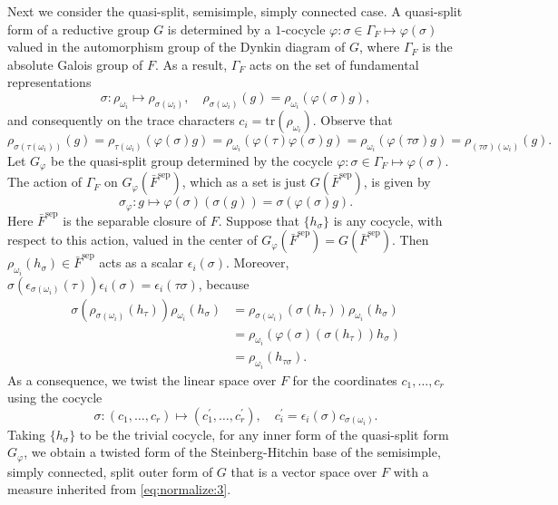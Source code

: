 \documentclass[iccmp]{ipbook}
\newcommand{\tr}{{\mathrm{tr}}}
\def\eps{{\epsilon}}
\def\sig{{\sigma}}
\def\ome{{\omega}}
\def\Gam{{\Gamma}}
\def\vphi{\varphi}
\def\p{\prime}
\def\sep{\mathrm{sep}}
\begin{document}
Next we consider the quasi-split, semisimple, simply connected case.
A quasi-split form of a reductive group $G$ is determined by a $1$-cocycle $\vphi:\sig\in \Gam_F\mapsto \vphi(\sig)$ valued in the automorphism group of the Dynkin diagram of $G$, where $\Gam_F$ is the absolute Galois group of $F$. As a result, $\Gam_F$ acts on the set of fundamental representations
$$
\sig:\rho_{\ome_i}
\mapsto \rho_{\sig(\ome_i)},\quad \rho_{\sig(\ome_i)}(g) = 
\rho_{\ome_i}(\vphi(\sig)g),
$$
and consequently on the trace characters $c_i = \tr(\rho_{\ome_i})$. Observe that
$$
\rho_{\sig(\tau(\ome_i))}(g) = 
\rho_{\tau(\ome_i)}(\vphi(\sig)g) = 
\rho_{\ome_i}(\vphi(\tau)\vphi(\sig)g) = 
\rho_{\ome_i}(\vphi(\tau\sig)g) = 
\rho_{(\tau\sig)(\ome_i)}(g).
$$
Let $G_\vphi$ be the quasi-split group determined by the cocycle $\vphi:\sig\in \Gam_F\mapsto \vphi(\sig)$. The action of $\Gam_F$ on $G_\vphi(\bar{F}^\sep)$, which as a set is just $G(\bar{F}^\sep)$, is given by 
$$
\sig_\vphi:g\mapsto \vphi(\sig)(\sig(g)) = \sig(\vphi(\sig)g).
$$
Here $\bar{F}^\sep$ is the separable closure of $F$. Suppose that $\{h_\sig\}$ is any cocycle, with respect to this action, valued in the center of $G_\vphi(\bar{F}^\sep) = G(\bar{F}^\sep)$. Then $\rho_{\ome_i}(h_\sig)\in \bar{F}^\sep$ acts as a scalar $\eps_i(\sig)$. Moreover, $\sig(\eps_{\sig(\ome_i)}(\tau))\eps_i(\sig) = \eps_i(\tau\sig)$, because 
\begin{align*}
\sig(\rho_{\sig(\ome_i)}(h_\tau))\rho_{\ome_i}(h_\sig)
&=
\rho_{\sig(\ome_i)}(\sig(h_\tau))\rho_{\ome_i}(h_\sig) \\
&=
\rho_{\ome_i}(\vphi(\sig)(\sig(h_\tau))h_\sig) \\
&= \rho_{\ome_i}(h_{\tau\sig}).
\end{align*}
As a consequence, we twist the linear space over $F$ for the coordinates $c_1,\ldots,c_r$ using the cocycle
$$
\sig:(c_1,\ldots,c_r)\mapsto (c_1^\p,\ldots,c_r^\p),\quad c^\p_i = \eps_i(\sig)c_{\sig(\ome_i)}.
$$
Taking $\{h_\sig\}$ to be the trivial cocycle, for any inner form of the quasi-split form $G_\vphi$, we obtain a twisted form of the Steinberg-Hitchin base of the semisimple, simply connected, split outer form of $G$ that is a vector space over $F$ with a measure inherited from \eqref{eq:normalize:3}.
\end{document}
